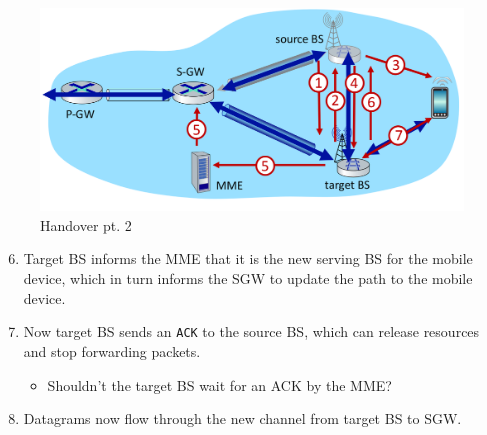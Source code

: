 \begin{paracol}{2}
   \begin{figure}[htbp]
      \centering
      \includegraphics{images/4g_BSHO2.png}
      \caption{Handover pt. 2}
      \label{fig:4g_BSHO2}
   \end{figure}
   \switchcolumn
   \begin{enumerate}
      \setcounter{enumi}{5}
      \item Target BS informs the MME that it is the new serving BS for the mobile device, which in turn informs the SGW to update the path to the mobile device.
      \item Now target BS sends an \texttt{ACK} to the source BS, which can release resources and stop forwarding packets.
      \begin{itemize}
         \item Shouldn't the target BS wait for an ACK by the MME?
      \end{itemize}
      \item Datagrams now flow through the new channel from target BS to SGW.
   \end{enumerate}
\end{paracol}